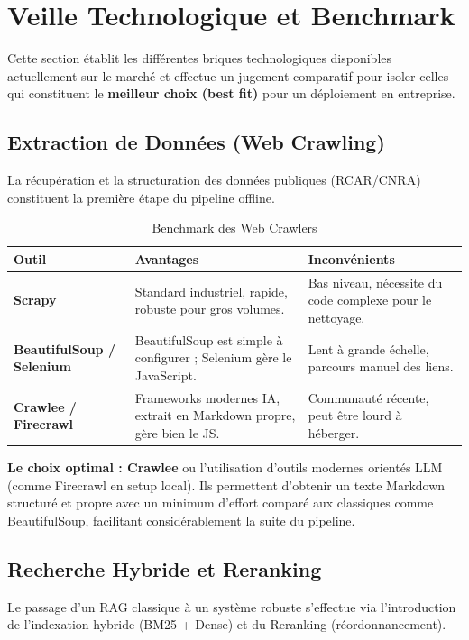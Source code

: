 \documentclass[12pt,a4paper]{article}
\begin{document}
\section{Veille Technologique et Benchmark}
Cette section établit les différentes briques technologiques disponibles actuellement sur le marché et effectue un jugement comparatif pour isoler celles qui constituent le \textbf{meilleur choix (best fit)} pour un déploiement en entreprise.

\subsection{Extraction de Données (Web Crawling)}
La récupération et la structuration des données publiques (RCAR/CNRA) constituent la première étape du pipeline offline.

\begin{table}[H]
    \centering
    \renewcommand{\arraystretch}{1.5}
    \begin{tabularx}{\textwidth}{|X|X|X|}
        \hline
        \textbf{Outil} & \textbf{Avantages} & \textbf{Inconvénients} \\
        \hline
        \textbf{Scrapy} & Standard industriel, rapide, robuste pour gros volumes. & Bas niveau, nécessite du code complexe pour le nettoyage. \\
        \hline
        \textbf{BeautifulSoup / Selenium} & BeautifulSoup est simple à configurer ; Selenium gère le JavaScript. & Lent à grande échelle, parcours manuel des liens. \\
        \hline
        \textbf{Crawlee / Firecrawl} & Frameworks modernes IA, extrait en Markdown propre, gère bien le JS. & Communauté récente, peut être lourd à héberger. \\
        \hline
    \end{tabularx}
    \caption{Benchmark des Web Crawlers}
\end{table}

\textbf{Le choix optimal : Crawlee} ou l'utilisation d'outils modernes orientés LLM (comme Firecrawl en setup local). Ils permettent d'obtenir un texte Markdown structuré et propre avec un minimum d'effort comparé aux classiques comme BeautifulSoup, facilitant considérablement la suite du pipeline.

\subsection{Recherche Hybride et Reranking}
Le passage d'un RAG classique à un système robuste s'effectue via l'introduction de l'indexation hybride (BM25 + Dense) et du Reranking (réordonnancement).
\end{document}

